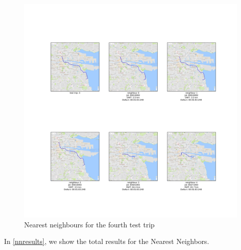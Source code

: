 \documentclass[12pt]{article}
\begin{document}
	\begin{figure} [H]
		\begin{center}
			\includegraphics [scale = 0.40] {nn4.jpg}
			\caption{Nearest neighbours for the fourth test trip}
		\end{center}
	\end{figure} 

	In \ref{nnresults}, we show the total results for the Nearest Neighbors.
	
\end{document}
